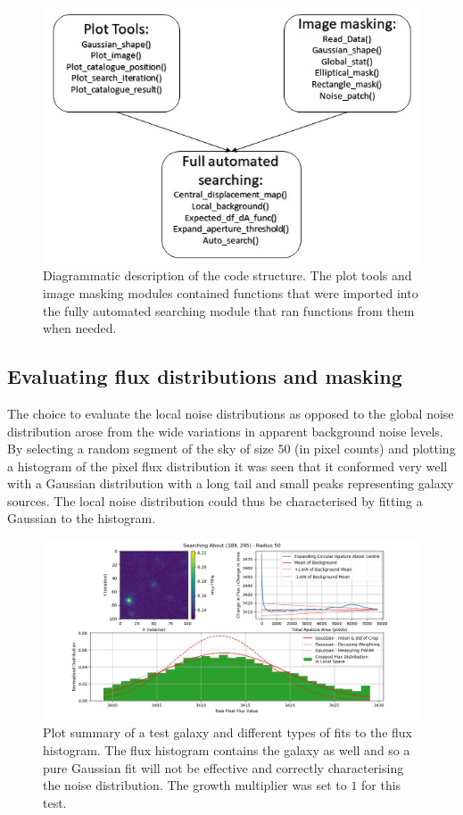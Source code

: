 \documentclass[journal]{IEEEtran}
\begin{document}
\begin{figure}[H]
    \centering
    \includegraphics[width=\linewidth]{Figure_9.jpg}
    \caption{Diagrammatic description of the code structure. The plot tools and image masking modules contained functions that were imported into the fully automated searching module that ran functions from them when needed.}
    \label{fig:1}
\end{figure}

\subsection{Evaluating flux distributions and masking}
The choice to evaluate the local noise distributions as opposed to the global noise distribution arose from the wide variations in apparent background noise levels. By selecting a random segment of the sky of size $50$ (in pixel counts) and plotting a histogram of the pixel flux distribution it was seen that it conformed very well with a Gaussian distribution with a long tail and small peaks representing galaxy sources. The local noise distribution could thus be characterised by fitting a Gaussian to the histogram.\newline
 \begin{figure}[H]
    \includegraphics[width = \linewidth]{Figure_4.png}
    \caption{Plot summary of a test galaxy and different types of fits to the flux histogram. The flux histogram contains the galaxy as well and so a pure Gaussian fit will not be effective and correctly characterising the noise distribution. The growth multiplier was set to $1$ for this test.}
    \label{fig:2}
 \end{figure}
 
\end{document}
